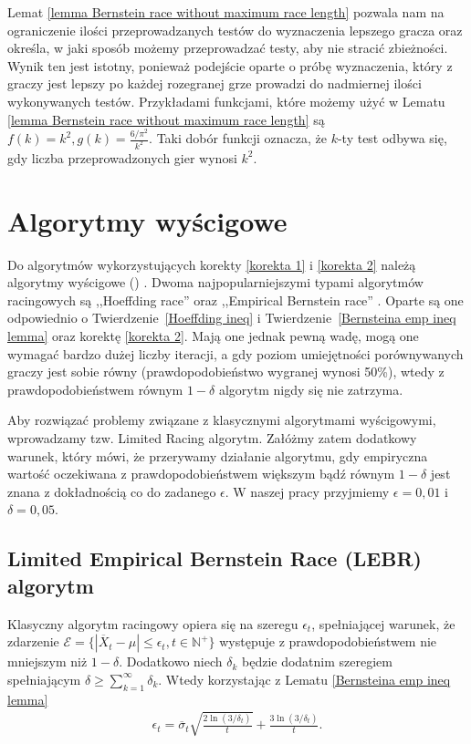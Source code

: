 \documentclass[inzynierska]{pwr_wmat_praca_dyplomowa}
\theoremstyle{plain}
\numberwithin{theorem}{chapter}
\theoremstyle{definition}
\numberwithin{theorem}{chapter}
\begin{document}
	Lemat \ref{lemma Bernstein race without maximum race length} pozwala nam na ograniczenie ilości przeprowadzanych testów do wyznaczenia lepszego gracza oraz określa, w jaki sposób możemy  przeprowadzać  testy, aby nie stracić zbieżności.
	Wynik ten jest istotny, ponieważ podejście oparte o próbę wyznaczenia, który z graczy jest lepszy po każdej rozegranej grze prowadzi do nadmiernej ilości wykonywanych testów.
	Przykładami funkcjami, które możemy użyć w Lematu \ref{lemma Bernstein race without maximum race length} są $f(k) = k^2, g(k) = \frac{6/\pi^2}{k^2}$. Taki dobór funkcji oznacza, że $k$-ty test odbywa się, gdy liczba przeprowadzonych gier wynosi $k^2$.
	\chapter{Algorytmy wyścigowe}
	Do algorytmów wykorzystujących korekty \ref{korekta 1} i \ref{korekta 2} należą algorytmy wyścigowe () . Dwoma najpopularniejszymi typami algorytmów racingowych są ,,Hoeffding race'' \cite{Maron-1993-15969} oraz ,,Empirical Bernstein race'' \cite{Mnih_2008}.
	Oparte są one odpowiednio o Twierdzenie~\ref{Hoeffding ineq} i Twierdzenie~\ref{Bernsteina emp ineq lemma} oraz korektę \ref{korekta 2}. Mają one jednak pewną wadę, mogą one wymagać bardzo dużej liczby iteracji, a gdy poziom umiejętności porównywanych graczy jest sobie równy (prawdopodobieństwo wygranej wynosi 50\%), wtedy z prawdopodobieństwem równym $1-\delta$ algorytm nigdy się nie zatrzyma.
	
	Aby rozwiązać problemy związane z klasycznymi algorytmami wyścigowymi, wprowadzamy tzw. Limited Racing algorytm. Załóżmy zatem dodatkowy warunek, który mówi, że przerywamy działanie algorytmu, gdy empiryczna wartość oczekiwana z prawdopodobieństwem większym bądź równym $1-\delta$ jest znana z dokładnością co do zadanego $\epsilon$. W naszej pracy przyjmiemy $\epsilon=0,01$ i $\delta = 0,05$.
	\section{Limited Empirical Bernstein Race (LEBR) algorytm}
	Klasyczny algorytm racingowy opiera się na szeregu $\epsilon_t$, spełniającej warunek, że zdarzenie $\mathcal{E}= \{|\overline{X}_t - \mu | \le \epsilon_t,  t\in \mathbb{N}^+\}$ występuje z prawdopodobieństwem nie mniejszym niż $1-\delta$. Dodatkowo niech $\delta_k$ będzie dodatnim szeregiem spełniającym $ \delta \ge \sum_{k = 1}^{\infty}\delta_k$. Wtedy korzystając z Lematu \ref{Bernsteina emp ineq lemma}
	\begin{gather*}
		\epsilon_t =  \overline{\sigma}_t \sqrt{\frac{2\ln(3/\delta_t)}{t}} + \frac{3  \ln{(3 / \delta_t)}}{t}.
	\end{gather*}
\end{document}

